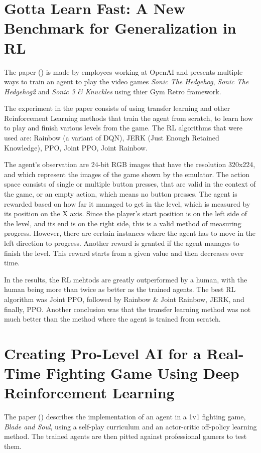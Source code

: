 \section{Gotta Learn Fast: A New Benchmark for Generalization in RL}
The paper (\cite{nichol2018gottalearnfast}) is made by employees working at OpenAI and presents multiple ways to train an agent to play the video games \emph{Sonic The Hedgehog}\texttrademark, \emph{Sonic The Hedgehog}\texttrademark\emph{2} and \emph{Sonic 3 \& Knuckles} using thier Gym Retro framework. 

The experiment in the paper consists of using transfer learning and other Reinforcement Learning methods that train the agent from scratch, to learn how to play and finish various levels from the game. The RL algorithms that were used are: Rainbow (a variant of DQN), JERK (Just Enough Retained Knowledge), PPO, Joint PPO, Joint Rainbow.

The agent's observation are 24-bit RGB images that have the resolution 320x224, and which represent the images of the game shown by the emulator. The action space consists of single or multiple button presses, that are valid in the context of the game, or an empty action, which means no button presses. The agent is rewarded based on how far it managed to get in the level, which is measured by its position on the X axis. Since the player's start position is on the left side of the level, and its end is on the right side, this is a valid method of measuring progress. However, there are certain instances where the agent has to move in the left direction to progress. Another reward is granted if the agent manages to finish the level. This reward starts from a given value and then decreases over time.

In the results, the RL mehtods are greatly outperformed by a human, with the human being more than twice as better as the trained agents. The best RL algorithm was Joint PPO, followed by Rainbow \& Joint Rainbow, JERK, and finally, PPO. Another conclusion was that the transfer learning method was not much better than the method where the agent is trained from scratch.



\section{Creating Pro-Level AI for a Real-Time Fighting Game Using Deep Reinforcement Learning}
The paper (\cite{oh2020creatingprolevelaiforfightinggame}) describes the implementation of an agent in a 1v1 fighting game, \emph{Blade and Soul}, using a self-play curriculum and an actor-critic off-policy learning method. The trained agents are then pitted against professional gamers to test them.

